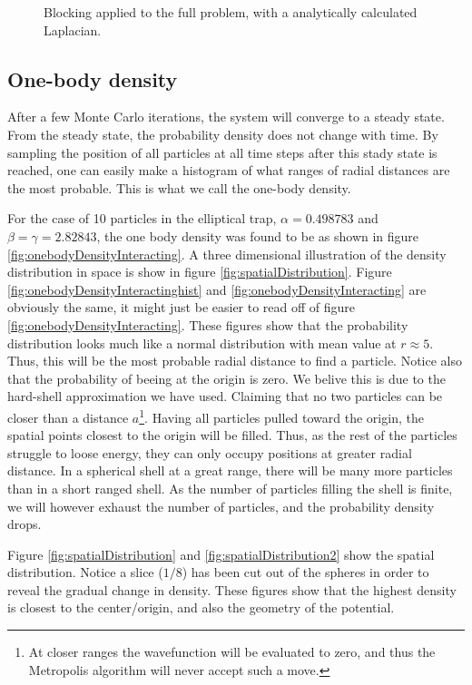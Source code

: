 \documentclass[english, a4paper]{article}
\begin{document}
\begin{figure}[H]
	\caption{Blocking applied to the full problem, with a analytically calculated Laplacian.}
	\label{fig:blocking_full}
\end{figure}

\subsection{One-body density}
After a few Monte Carlo iterations, the system will converge to a steady state.
From the steady state, the probability density does not change with time. 
By sampling the position of all particles at all time steps after this stady state is 
reached, one can easily make a histogram of what ranges of radial distances are the most probable.
This is what we call the one-body density. 

For the case of 10 particles in the elliptical trap, $\alpha = 0.498783$ and $\beta = \gamma = 2.82843$, the one body density was found to be as shown in figure \ref{fig:onebodyDensityInteracting}.
A three dimensional illustration of the density distribution in space is show in figure \ref{fig:spatialDistribution}. 
Figure \ref{fig:onebodyDensityInteractinghist} and \ref{fig:onebodyDensityInteracting} are obviously the same, it might just be easier to read off of figure \ref{fig:onebodyDensityInteracting}. These figures show that the probability distribution looks much like a normal distribution with mean value at $r\approx5$. Thus, this will be the most probable radial distance to find a particle. Notice also that the probability of beeing at the origin is zero. We belive this is due to the hard-shell approximation we have used. Claiming that no two particles can be closer than a distance $a$\footnote{At closer ranges the wavefunction will be evaluated to zero, and thus the Metropolis algorithm will never accept such a move.}. Having all particles pulled toward the origin, the spatial points closest to the origin will be filled. Thus, as the rest of the particles struggle to loose energy, they can only occupy positions at greater radial distance. In a spherical shell at a great range, there will be many more particles than in a short ranged shell. As the number of particles filling the shell is finite, we will however exhaust the number of particles, and the probability density drops. 

Figure \ref{fig:spatialDistribution} and \ref{fig:spatialDistribution2} show the spatial distribution. Notice a slice ($1/8$) has been cut out of the spheres in order to reveal the gradual change in density. These figures show that the highest density is closest to the center/origin, and also the geometry of the potential. 
\end{document}
